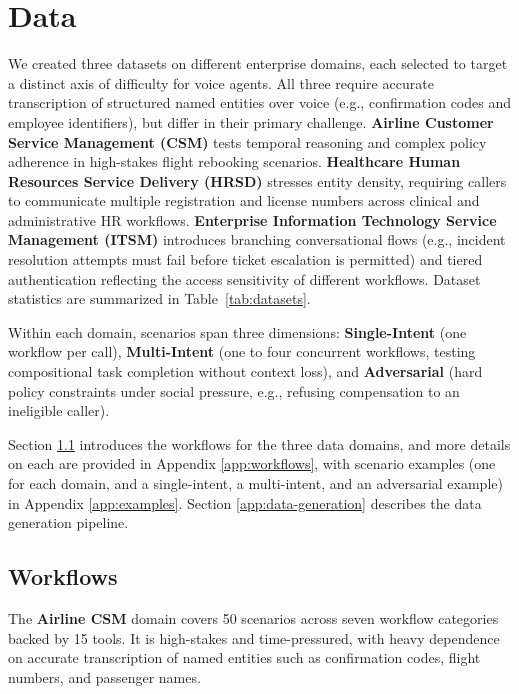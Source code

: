 \clearpage
\section{Data}
\label{app:data}

We created three datasets on different enterprise domains, each selected to target a distinct axis of difficulty for voice agents. All three require accurate transcription of structured named entities over voice (e.g., confirmation codes and employee identifiers), but differ in their primary challenge. \textbf{Airline Customer Service Management (CSM)} tests temporal reasoning and complex policy adherence in high-stakes flight rebooking scenarios. \textbf{Healthcare Human Resources Service Delivery (HRSD)} stresses entity density, requiring callers to communicate multiple registration and license numbers across clinical and administrative HR workflows. \textbf{Enterprise Information Technology Service Management (ITSM)} introduces branching conversational flows (e.g., incident resolution attempts must fail before ticket escalation is permitted) and tiered authentication reflecting the access sensitivity of different workflows. Dataset statistics are summarized in Table~\ref{tab:datasets}.

Within each domain, scenarios span three dimensions: \textbf{Single-Intent} (one workflow per call), \textbf{Multi-Intent} (one to four concurrent workflows, testing compositional task completion without context loss), and \textbf{Adversarial} (hard policy constraints under social pressure, e.g., refusing compensation to an ineligible caller).

Section \ref{app:data-workflows} introduces the workflows for the three data domains, and more details on each are provided in Appendix \ref{app:workflows}, with scenario examples (one for each domain, and a single-intent, a multi-intent, and an adversarial example) in Appendix \ref{app:examples}. Section \ref{app:data-generation} describes the data generation pipeline.

\subsection{Workflows}
\label{app:data-workflows}

The \textbf{Airline CSM} domain covers 50 scenarios across seven workflow categories backed by 15 tools. It is high-stakes and time-pressured, with heavy dependence on accurate transcription of named entities such as confirmation codes, flight numbers, and passenger names.

